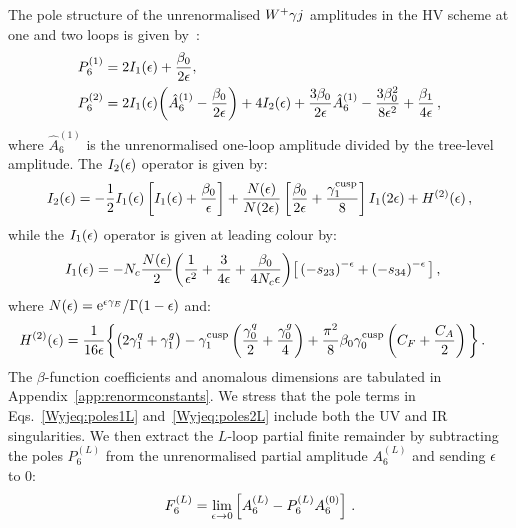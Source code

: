 \documentclass[main.tex]{subfiles}
\begin{document}
The pole structure of the unrenormalised $W^+\gamma j$ amplitudes in the HV scheme at one and two loops is given by~\cite{Catani:1998bh,Becher:2009qa,Becher:2009cu,Gardi:2009qi}:
\begin{align}
P_6^{(1)} & = 2 I_1(\epsilon) + \frac{\beta_0}{2\epsilon},
\label{Wyjeq:poles1L} \\
P_6^{(2)} & =   2 I_1(\epsilon) \bigg( \hat{A}^{(1)}_6 - \frac{\beta_0}{2\epsilon} \bigg) + 4 I_2(\epsilon)
                +  \frac{3\beta_0}{2\epsilon}  \hat{A}^{(1)}_6  - \frac{3\beta_0^2}{8\epsilon^2} + \frac{\beta_1}{4\epsilon}  \,,
\label{Wyjeq:poles2L}
\end{align}
where $\hat{A}^{(1)}_6$ is the unrenormalised one-loop amplitude divided by the tree-level amplitude. 
The $I_2(\epsilon)$ operator is given by:
\begin{equation}
I_2(\epsilon) =   - \frac{1}{2}I_1(\epsilon) \left[ I_1(\epsilon)
              + \frac{\beta_0}{\epsilon} \right]
              + \frac{N(\epsilon)}{N(2\epsilon)} \left[ \frac{\beta_0}{2\epsilon}
                        + \frac{\gamma_{1}^{{\mathrm{cusp}}}}{8} \right] I_1(2\epsilon)
              + H^{(2)}(\epsilon) \,,
\end{equation}
while the $I_1(\epsilon)$ operator is given at leading colour by:
\begin{align}
I_1(\epsilon) &= -N_c \frac{N(\epsilon)}{2} \bigg( \frac{1}{\epsilon^2} + \frac{3}{4\epsilon} + \frac{\beta_0}{4 N_c \epsilon} \bigg) \big[ \left(-s_{23}\right)^{-\epsilon} + \left(-s_{34}\right)^{-\epsilon} \big] \,,
\label{Wyjeq:I1}
\end{align}
where $N(\epsilon) = {\mathrm{e}^{\epsilon \gamma_E}}/{\Gamma(1-\epsilon)}$ and:
\begin{align}
H^{(2)}(\epsilon) &= \frac{1}{16\epsilon} \bigg\lbrace \big(2\gamma_1^q+\gamma_1^g\big)
                                                - \gamma_1^{\mathrm{cusp}} \left(\frac{\gamma_0^q}{2}+\frac{\gamma_0^g}{4}\right)
                                                + \frac{\pi^2}{8} \beta_0 \gamma_0^{\mathrm{cusp}} \left(C_F+\frac{C_A}{2}\right) \bigg\rbrace \,.
\end{align}
The $\beta$-function coefficients and anomalous dimensions are tabulated in Appendix~\ref{app:renormconstants}. We stress that the pole terms in Eqs.~\ref{Wyjeq:poles1L} and~\ref{Wyjeq:poles2L} include both the UV and IR singularities. We then extract the $L$-loop partial finite remainder by subtracting the poles $P_6^{(L)}$ from the unrenormalised partial amplitude $A_6^{(L)}$ and sending $\epsilon$ to $0$:
\begin{equation}
F_6^{(L)} = \lim_{\epsilon \to 0} \left[ A_6^{(L)} - P_6^{(L)} A_6^{(0)} \right]\,.
\label{Wyjeq:finiteremainder}
\end{equation}
\end{document}
